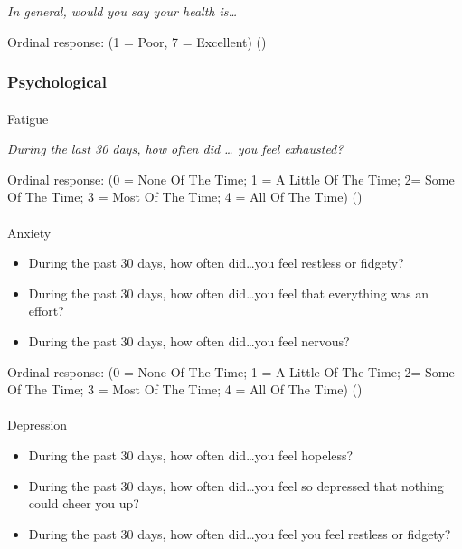 \documentclass[
  single column]{article}
\makeatletter
\let\oldparagraph\paragraph
\renewcommand{\paragraph}{
    \@ifstar
      \xxxParagraphStar
      \xxxParagraphNoStar
  }
\newcommand{\xxxParagraphStar}[1]{\oldparagraph*{#1}\mbox{}}
\newcommand{\xxxParagraphNoStar}[1]{\oldparagraph{#1}\mbox{}}
\providecommand{\tightlist}{%
  \setlength{\itemsep}{0pt}\setlength{\parskip}{0pt}}\usepackage{longtable,booktabs,array}
\makeatother
\begin{document}
\emph{In general, would you say your health is\ldots{}}

Ordinal response: (1 = Poor, 7 = Excellent)
()

\subsubsection{Psychological}\label{psychological}

\paragraph{Fatigue}\label{fatigue}

\emph{During the last 30 days, how often did \ldots{} you feel
exhausted?}

Ordinal response: (0 = None Of The Time; 1 = A Little Of The Time; 2=
Some Of The Time; 3 = Most Of The Time; 4 = All Of The Time)
()

\paragraph{Anxiety}\label{anxiety}

\begin{itemize}
\tightlist
\item
  During the past 30 days, how often did\ldots you feel restless or
  fidgety?
\item
  During the past 30 days, how often did\ldots you feel that everything
  was an effort?
\item
  During the past 30 days, how often did\ldots you feel nervous?
\end{itemize}

Ordinal response: (0 = None Of The Time; 1 = A Little Of The Time; 2=
Some Of The Time; 3 = Most Of The Time; 4 = All Of The Time)
()

\paragraph{Depression}\label{depression-1}

\begin{itemize}
\tightlist
\item
  During the past 30 days, how often did\ldots you feel hopeless?
\item
  During the past 30 days, how often did\ldots you feel so depressed
  that nothing could cheer you up?
\item
  During the past 30 days, how often did\ldots you feel you feel
  restless or fidgety?
\end{itemize}
\end{document}
